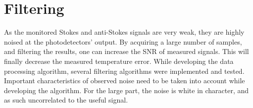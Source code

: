 \documentclass{standalone}
\begin{document}
\section{Filtering}

As the monitored Stokes and anti-Stokes signals are very weak, they are highly noised at the photodetectors' output. By acquiring a large number of samples, and filtering the results, one can increase the SNR of measured signals. This will finally decrease the measured temperature error. While developing the data processing algorithm, several filtering algorithms were implemented and tested. Important characteristics of observed noise need to be taken into account while developing the algorithm. For the large part, the noise is white in character, and as such uncorrelated to the useful signal. \\
\end{document}

